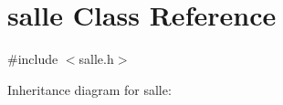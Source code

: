 \hypertarget{classsalle}{}\section{salle Class Reference}
\label{classsalle}


{\ttfamily \#include $<$salle.\+h$>$}



Inheritance diagram for salle\+:
